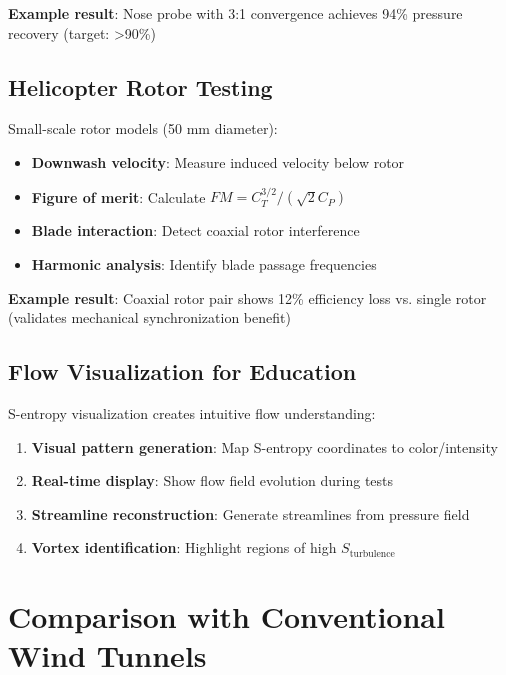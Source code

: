 \documentclass[12pt,a4paper]{article}
\begin{document}
\textbf{Example result}: Nose probe with 3:1 convergence achieves 94\% pressure recovery (target: >90\%)

\subsection{Helicopter Rotor Testing}

Small-scale rotor models (50 mm diameter):

\begin{itemize}
\item \textbf{Downwash velocity}: Measure induced velocity below rotor
\item \textbf{Figure of merit}: Calculate $FM = C_T^{3/2}/(\sqrt{2}C_P)$
\item \textbf{Blade interaction}: Detect coaxial rotor interference
\item \textbf{Harmonic analysis}: Identify blade passage frequencies
\end{itemize}

\textbf{Example result}: Coaxial rotor pair shows 12\% efficiency loss vs. single rotor (validates mechanical synchronization benefit)

\subsection{Flow Visualization for Education}

S-entropy visualization creates intuitive flow understanding:

\begin{enumerate}
\item \textbf{Visual pattern generation}: Map S-entropy coordinates to color/intensity
\item \textbf{Real-time display}: Show flow field evolution during tests
\item \textbf{Streamline reconstruction}: Generate streamlines from pressure field
\item \textbf{Vortex identification}: Highlight regions of high $S_{\text{turbulence}}$
\end{enumerate}

\section{Comparison with Conventional Wind Tunnels}
\end{document}
